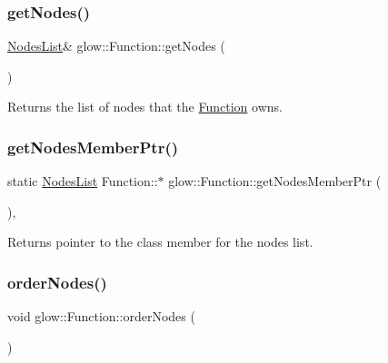 \subsubsection{\texorpdfstring{get\+Nodes()}{getNodes()}}
{\footnotesize\ttfamily \hyperlink{namespaceglow_a4919b7ef01548e927f0a5acb3a7400b9}{Nodes\+List}\& glow\+::\+Function\+::get\+Nodes (\begin{DoxyParamCaption}{ }\end{DoxyParamCaption})\hspace{0.3cm}{\ttfamily [inline]}}

\begin{DoxyReturn}{Returns}
the list of nodes that the \hyperlink{classglow_1_1_function}{Function} owns. 
\end{DoxyReturn}
\mbox{\label{classglow_1_1_function_aa766431c358524e3dfeafc66d1cdcb4f}} 
\subsubsection{\texorpdfstring{get\+Nodes\+Member\+Ptr()}{getNodesMemberPtr()}}
{\footnotesize\ttfamily static \hyperlink{namespaceglow_a4919b7ef01548e927f0a5acb3a7400b9}{Nodes\+List} Function\+::$\ast$ glow\+::\+Function\+::get\+Nodes\+Member\+Ptr (\begin{DoxyParamCaption}{ }\end{DoxyParamCaption})\hspace{0.3cm}{\ttfamily [inline]}, {\ttfamily [static]}}

\begin{DoxyReturn}{Returns}
pointer to the class member for the nodes list. 
\end{DoxyReturn}
\mbox{\label{classglow_1_1_function_ab1dabb8d94895004268410f672079f1a}} 
\subsubsection{\texorpdfstring{order\+Nodes()}{orderNodes()}}
{\footnotesize\ttfamily void glow\+::\+Function\+::order\+Nodes (\begin{DoxyParamCaption}{ }\end{DoxyParamCaption})\hspace{0.3cm}{\ttfamily [inline]}}

